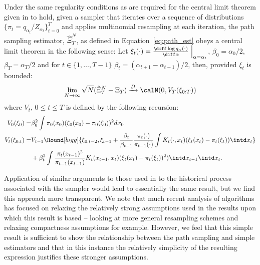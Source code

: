 \begin{proposition}\label{prop:path_clt}
  Under the same regularity conditions as are required for the central limit
  theorem given in \cite{DelMoral:2006hc} to hold, given a \smc sampler that
  iterates over a sequence of distributions $\{\pi_t =
  q_{\alpha_t}/Z_{\alpha_t}\}_{t=0}^T$ and applies multinomial resampling at
  each iteration, the path sampling estimator, $\hat\Xi_{T}^{N}$, as
  defined in Equation~\eqref{eq:path_est} obeys a central limit theorem in the
  following sense: Let $\xi_t(\cdot) = \frac{\diff\log
    q_{\alpha}(\cdot)}{\diff\alpha}\Bigm|_{\alpha = \alpha_t}$, $\beta_{0} =
  \alpha_0 / 2$, $\beta_{T} = \alpha_T / 2$ and for $t \in \{1,\ldots,T-1\}$
  $\beta_t = (\alpha_{t + 1} - \alpha_{t-1})/2$, then, provided $\xi_t$ is
  bounded:
  \begin{equation}
    \lim_{N\to\infty}\sqrt{N}(\hat\Xi_{T}^{N} - \Xi_T)
    \xrightarrow{D}\calN(0, V_T(\xi_{0:T}))
  \end{equation}
  where $V_t$, $0\le t \le T$ is defined by the following recursion:
  \begin{align}
    V_0(\xi_0) =&  \beta_0^2
    \int \pi_0(x_0) (\xi_0(x_0)
    - \pi_0(\xi_0))^2 dx_0 \\
    V_t(\xi_{0:t}) =& V_{t-1}\Round[bigg]{\xi_{0:t-2}, \xi_{t-1}
    + \frac{\beta_t}{\beta_{t-1}}
    \frac{\pi_{t}(\cdot)}{\pi_{t-1}(\cdot)}
    \int K_t(\cdot,x_t) (\xi_t(x_t)-\pi_t(\xi_t)) \intd x_t
    } \\\notag
    &+ \beta_t^2 \int\frac{\pi_t(x_{t-1})^2}{\pi_{t-1}(x_{t-1})}
    K_t(x_{t-1},x_t)(\xi_t(x_t) - \pi_t(\xi_t))^2) \intd x_{t-1} \intd x_t.
  \end{align}
\end{proposition}

Application of similar arguments to those used in \cite{DelMoral:2006hc} to
the historical process associated with the \smc sampler would lead to
essentially the same result, but we find this approach more transparent. We
note that much recent analysis of \smc algorithms has focused on relaxing the
relatively strong assumptions used in the results upon which this result is
based -- looking at more general resampling schemes \cite{DelMoral:2012jq} and
relaxing compactness assumptions \cite{Whiteley:2013vx} for example. However,
we feel that this simple result is sufficient to show the relationship between
the path sampling and simple estimators and that in this instance the
relatively simplicity of the resulting expression justifies these stronger
assumptions.

